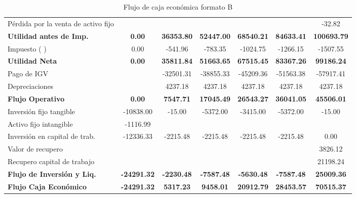 \documentclass[a4paper,openright,12pt]{book}
\begin{document}
\begin{table}[H]
{\begin{tabular}{lcccccc}
Pérdida por la venta de activo   fijo &                    &                   &                   &                   &                   & -32.82             \\
\textbf{Utilidad antes de Imp.}       & \textbf{0.00}      & \textbf{36353.80} & \textbf{52447.00} & \textbf{68540.21} & \textbf{84633.41} & \textbf{100693.79} \\
Impuesto ( )                          & 0.00               & -541.96           & -783.35           & -1024.75          & -1266.15          & -1507.55           \\
\textbf{Utilidad Neta}                & \textbf{0.00}      & \textbf{35811.84} & \textbf{51663.65} & \textbf{67515.45} & \textbf{83367.26} & \textbf{99186.24}  \\
Pago de IGV                           &                    & -32501.31         & -38855.33         & -45209.36         & -51563.38         & -57917.41          \\
Depreciaciones                        &                    & 4237.18           & 4237.18           & 4237.18           & 4237.18           & 4237.18            \\
\textbf{Flujo Operativo}              & \textbf{0.00}      & \textbf{7547.71}  & \textbf{17045.49} & \textbf{26543.27} & \textbf{36041.05} & \textbf{45506.01}  \\
Inversión fijo tangible               & -10838.00          & -15.00            & -5372.00          & -3415.00          & -5372.00          & -15.00             \\
Activo fijo intangible                & -1116.99           &                   &                   &                   &                   &                    \\
Inversión en capital de trab.         & -12336.33          & -2215.48          & -2215.48          & -2215.48          & -2215.48          & 0.00               \\
Valor de recupero                     &                    &                   &                   &                   &                   & 3826.12            \\
Recupero capital de trabajo           &                    &                   &                   &                   &                   & 21198.24           \\
\textbf{Flujo de Inversión y Liq.}    & \textbf{-24291.32} & \textbf{-2230.48} & \textbf{-7587.48} & \textbf{-5630.48} & \textbf{-7587.48} & \textbf{25009.36}  \\
\textbf{Flujo Caja Económico}         & \textbf{-24291.32} & \textbf{5317.23}  & \textbf{9458.01}  & \textbf{20912.79} & \textbf{28453.57} & \textbf{70515.37} \\
\hline
\end{tabular}
}
\caption{Flujo de caja económica formato B}
\label{Tabla26}
\end{table}
\end{document}
